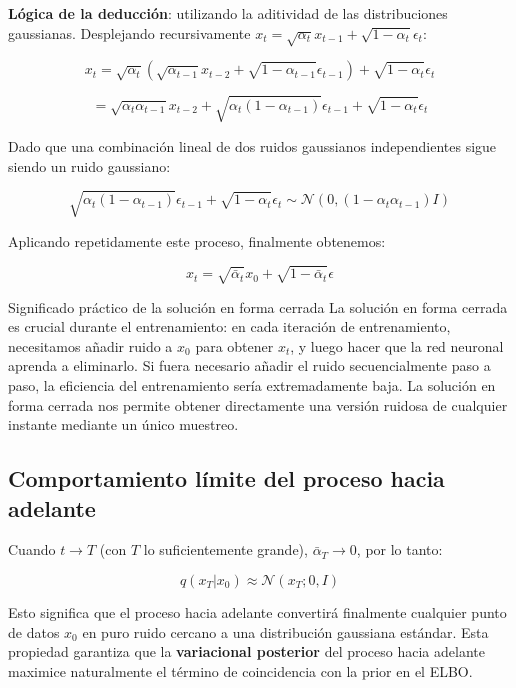 \documentclass[a4paper]{article}
\begin{document}
\textbf{Lógica de la deducción}: utilizando la aditividad de las distribuciones gaussianas. Desplejando recursivamente $x_t = \sqrt{\alpha_t} x_{t-1} + \sqrt{1-\alpha_t} \epsilon_t$:

$$x_t = \sqrt{\alpha_t} (\sqrt{\alpha_{t-1}} x_{t-2} + \sqrt{1-\alpha_{t-1}} \epsilon_{t-1}) + \sqrt{1-\alpha_t} \epsilon_t$$

$$= \sqrt{\alpha_t \alpha_{t-1}} x_{t-2} + \sqrt{\alpha_t(1-\alpha_{t-1})} \epsilon_{t-1} + \sqrt{1-\alpha_t} \epsilon_t$$

Dado que una combinación lineal de dos ruidos gaussianos independientes sigue siendo un ruido gaussiano:

$$\sqrt{\alpha_t(1-\alpha_{t-1})} \epsilon_{t-1} + \sqrt{1-\alpha_t} \epsilon_t \sim \mathcal{N}(0, (1-\alpha_t\alpha_{t-1}) I)$$

Aplicando repetidamente este proceso, finalmente obtenemos:

$$x_t = \sqrt{\bar{\alpha}_t} x_0 + \sqrt{1-\bar{\alpha}_t} \epsilon$$

\begin{knowledgebox}{Significado práctico de la solución en forma cerrada}
La solución en forma cerrada es crucial durante el entrenamiento: en cada iteración de entrenamiento, necesitamos añadir ruido a $x_0$ para obtener $x_t$, y luego hacer que la red neuronal aprenda a eliminarlo. Si fuera necesario añadir el ruido secuencialmente paso a paso, la eficiencia del entrenamiento sería extremadamente baja. La solución en forma cerrada nos permite obtener directamente una versión ruidosa de cualquier instante mediante un único muestreo.
\end{knowledgebox}

\subsection{Comportamiento límite del proceso hacia adelante}

Cuando $t \to T$ (con $T$ lo suficientemente grande), $\bar{\alpha}_T \to 0$, por lo tanto:

$$q(x_T | x_0) \approx \mathcal{N}(x_T; 0, I)$$

Esto significa que el proceso hacia adelante convertirá finalmente cualquier punto de datos $x_0$ en puro ruido cercano a una distribución gaussiana estándar. Esta propiedad garantiza que la \textbf{variacional posterior} del proceso hacia adelante maximice naturalmente el término de coincidencia con la prior en el ELBO.
\end{document}
